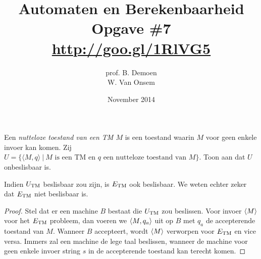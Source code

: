 \documentclass[a4paper]{article}
\title{Automaten en Berekenbaarheid\\Opgave \#7\\\url{http://goo.gl/1RlVG5}}
\author{prof. B. Demoen\\W. Van Onsem}
\date{November 2014}
\begin{document}
\maketitle

\begin{question}
Een \emph{nutteloze toestand van een TM $M$} is een toestand waarin $M$ voor geen enkele invoer kan komen. Zij $U = \{ \langle M, q \rangle \ | \ \text{$M$ is een TM en $q$ een nutteloze toestand van $M$} \}$. Toon aan dat $U$ onbeslisbaar is.
\begin{answer}
Indien $U_{\rm TM}$ beslisbaar zou zijn, is $E_{\rm TM}$ ook beslisbaar. We weten echter zeker dat $E_{\rm TM}$ niet beslisbaar is.
\begin{proof}
Stel dat er een machine $B$ bestaat die $U_{\rm TM}$ zou beslissen. Voor invoer $\left\langle M \right\rangle$ voor het $E_{\rm TM}$ probleem, dan voeren we $\left\langle M,q_a \right\rangle$ uit op $B$ met $q_a$ de accepterende toestand van $M$. Wanneer $B$ accepteert, wordt $\left\langle M \right\rangle$ verworpen voor $E_{\rm TM}$ en vice versa. Immers zal een machine de lege taal beslissen, wanneer de machine voor geen enkele invoer string $s$ in de accepterende toestand kan terecht komen.
\end{proof}
\end{answer}
\end{question}
\end{document}
